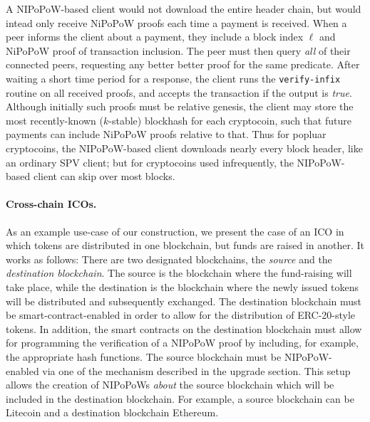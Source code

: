 A NIPoPoW-based client would not download the entire header chain, but would intead only receive NiPoPoW proofs each time a payment is received. When a peer informs the client about a payment, they include a block index $\ell$ and NiPoPoW proof of transaction inclusion. The peer must then query \emph{all} of their connected peers, requesting any better better proof for the same predicate. After waiting a short time period for a response, the client runs the \texttt{verify-infix} routine on all received proofs, and accepts the transaction if the output is \emph{true}. Although initially such proofs must be relative genesis, the client may store the most recently-known ($k$-stable) blockhash for each cryptocoin, such that future payments can include NiPoPoW proofs relative to that. Thus for popluar cryptocoins, the NIPoPoW-based
client downloads nearly every block header, like an ordinary SPV client; but for
cryptocoins used infrequently, the NIPoPoW-based client can skip over most
blocks.

\paragraph{Cross-chain ICOs.}
As an example use-case of our construction, we present the case of an
ICO in which tokens are distributed in one blockchain,
but funds are raised in another. It works as follows:
There are two designated blockchains, the \textit{source} and
the \textit{destination blockchain}. The source is the blockchain
where the fund-raising will take place, while the destination is the
blockchain where the newly issued tokens will be distributed and subsequently
exchanged. The destination blockchain must be smart-contract-enabled in order to
allow for the distribution of ERC-20-style~\cite{erc20} tokens.
In addition, the smart contracts on the destination blockchain must allow for
programming the verification of a NIPoPoW proof by including, for example, the
appropriate hash functions. The source blockchain must be NIPoPoW-enabled via
one of the mechanism described in the upgrade section. This setup allows the
creation of NIPoPoWs \textit{about} the source blockchain which will be included
in the destination blockchain. For example, a source blockchain can be Litecoin
and a destination blockchain Ethereum.

